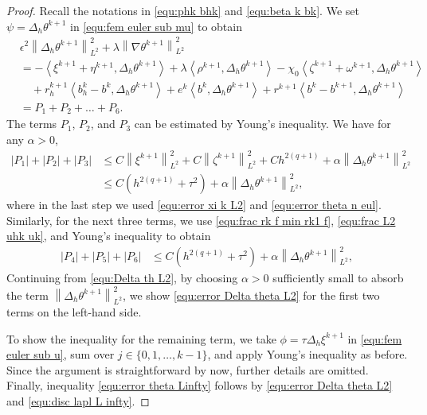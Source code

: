 \documentclass[11pt, reqno]{amsart}
\theoremstyle{definition}
\numberwithin{equation}{section}
\newcommand{\norm}[2]{\left\|{#1}\right\|_{#2}}
\newcommand{\inpro}[2]{\left\langle#1,#2\right\rangle}
\newcommand{\abs}[1]{\left|{#1}\right|}
\begin{document}
\begin{proof}
Recall the notations in \eqref{equ:phk bhk} and \eqref{equ:beta k bk}.
We set $\psi=\Delta_h \theta^{k+1}$ in \eqref{equ:fem euler sub mu} to obtain
\begin{align}\label{equ:Delta th L2}
    &\epsilon^2 \norm{\Delta_h \theta^{k+1}}{L^2}^2
    +
    \lambda \norm{\nabla \theta^{k+1}}{L^2}^2
    \nonumber\\
    &=
    - \inpro{\xi^{k+1}+\eta^{k+1}}{\Delta_h \theta^{k+1}}
    +
    \lambda \inpro{\rho^{k+1}}{\Delta_h \theta^{k+1}}
    -
    \chi_0 \inpro{\zeta^{k+1}+\omega^{k+1}}{\Delta_h \theta^{k+1}}
    \nonumber\\
    &\quad
    +
		r_h^{k+1} \inpro{b_h^k-b^k}{\Delta_h \theta^{k+1}}
		+ 
		e^k \inpro{b^k}{\Delta_h \theta^{k+1}}
		+
		r^{k+1} \inpro{b^k-b^{k+1}}{\Delta_h \theta^{k+1}}
    \nonumber\\
    &=P_1+P_2+\ldots +P_6.
\end{align}
The terms $P_1$, $P_2$, and $P_3$ can be estimated by Young's inequality. We have for any $\alpha>0$,
\begin{align*}
    \abs{P_1}+\abs{P_2}+\abs{P_3}
    &\leq
    C\norm{\xi^{k+1}}{L^2}^2
    +
    C\norm{\zeta^{k+1}}{L^2}^2
    +
    Ch^{2(q+1)}
    +
    \alpha \norm{\Delta_h \theta^{k+1}}{L^2}^2
    \\
    &\leq
    C(h^{2(q+1)}+ \tau^2)+\alpha \norm{\Delta_h \theta^{k+1}}{L^2}^2,
\end{align*}
where in the last step we used \eqref{equ:error xi k L2} and \eqref{equ:error theta n eul}. Similarly, for the next three terms, we use \eqref{equ:frac rk f min rk1 f}, \eqref{equ:frac L2 uhk uk}, and Young's inequality to obtain
\begin{align*}
    \abs{P_4}+\abs{P_5}+\abs{P_6}
    &\leq
    C(h^{2(q+1)}+ \tau^2)+\alpha \norm{\Delta_h \theta^{k+1}}{L^2}^2,
\end{align*}
Continuing from \eqref{equ:Delta th L2}, by choosing $\alpha>0$ sufficiently small to absorb the term $\norm{\Delta_h \theta^{k+1}}{L^2}^2$, we show \eqref{equ:error Delta theta L2} for the first two terms on the left-hand side.

To show the inequality for the remaining term, we take $\phi=\tau \Delta_h \xi^{k+1}$ in \eqref{equ:fem euler sub u}, sum over $j\in \{0,1,\ldots,k-1\}$, and apply Young's inequality as before. Since the argument is straightforward by now, further details are omitted. Finally, inequality \eqref{equ:error theta Linfty} follows by \eqref{equ:error Delta theta L2} and \eqref{equ:disc lapl L infty}.
\end{proof}
\end{document}
